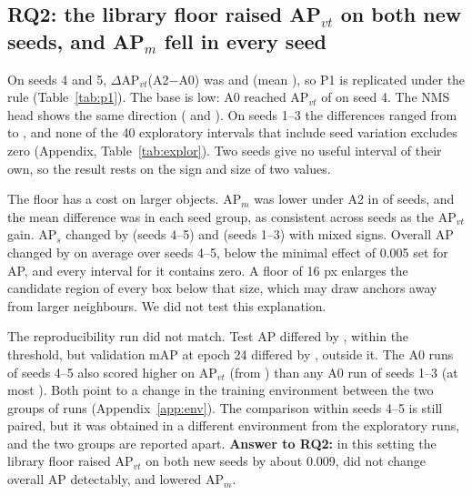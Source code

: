 \documentclass[11pt]{article}
\begin{document}
\subsection{RQ2: the library floor raised AP$_{vt}$ on both new seeds, and AP$_m$ fell in every seed}\label{sec:rq2}
On seeds 4 and 5, $\Delta$AP$_{vt}$(A2$-$A0) was \pOneSFour{} and \pOneSFive{} (mean \pOneMean), so P1 is replicated under
the rule (Table~\ref{tab:p1}). The base is low: A0 reached AP$_{vt}$ of \pOneAzeroSFour{} on seed 4. The NMS head shows the same
direction (\pOneNmsSFour{} and \pOneNmsSFive). On seeds 1--3 the differences ranged from \pOneOldMin{} to \pOneOldMax, and none of
the 40 exploratory intervals that include seed variation excludes zero (Appendix, Table~\ref{tab:explor}). Two seeds give no
useful interval of their own, so the result rests on the sign and size of two values.

The floor has a cost on larger objects. AP$_m$ was lower under A2 in \apmNeg{} of \apmSeeds{} seeds, and the mean difference was
\apmNewMean{} in each seed group, as consistent across seeds as the AP$_{vt}$ gain. AP$_s$ changed by \apsNewMean{} (seeds 4--5)
and \apsOldMean{} (seeds 1--3) with mixed signs. Overall AP changed by \apNewMean{} on average over seeds 4--5, below the
minimal effect of 0.005 set for AP, and every interval for it contains zero. A floor of 16 px enlarges the candidate region of
every box below that size, which may draw anchors away from larger neighbours. We did not test this explanation.

The reproducibility run did not match. Test AP differed by \rzeroDap, within the threshold, but validation mAP at epoch 24
differed by \rzeroDval, outside it. The A0 runs of seeds 4--5 also scored higher on AP$_{vt}$ (from \aZeroNewMin) than any A0 run
of seeds 1--3 (at most \aZeroOldMax). Both point to a change in the training environment between the two groups of runs
(Appendix~\ref{app:env}). The comparison within seeds 4--5 is still paired, but it was obtained in a different environment from
the exploratory runs, and the two groups are reported apart. \textbf{Answer to RQ2:} in this setting the library floor raised
AP$_{vt}$ on both new seeds by about 0.009, did not change overall AP detectably, and lowered AP$_m$.

\begin{table}[t]\centering\caption{Test AP per seed, e2e head. $\Delta$ is A2 minus A0. Seeds 1--3 were seen before P1 was fixed;
seeds 4--5 were trained afterwards, in a different environment (Section~\ref{sec:rq2}).}\label{tab:p1}\scriptsize
\end{table}
\end{document}
